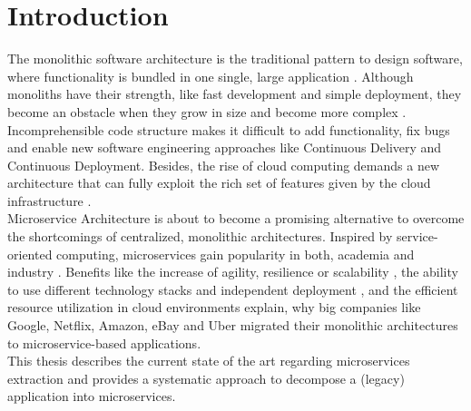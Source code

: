 
\chapter{Introduction}
\label{ch:Introduction}
The monolithic software architecture is the traditional pattern to design software, where functionality is bundled in one single, large application \cite{DataflowDrivenChen}. Although monoliths have their strength, like fast development and simple deployment, they become an obstacle when they grow in size and become more complex \cite{infoq}. Incomprehensible code structure makes it difficult to add functionality, fix bugs and enable new software engineering approaches like Continuous Delivery and Continuous Deployment. 
Besides, the rise of cloud computing demands a new architecture that can fully exploit the rich set of features given by the cloud infrastructure \cite{MigratingCloud}. \\
Microservice Architecture is about to become a promising alternative to overcome the shortcomings of centralized, monolithic architectures. Inspired by service-oriented computing, microservices gain popularity in both, academia and industry \cite{ObjectAwareAmiri}. Benefits like the increase of agility, resilience or scalability \cite{FunctionalDecompositionHeinrich}, the ability to use different technology stacks and independent deployment \cite{interfaceAnalysisBaresi}, and the efficient resource utilization in cloud environments \cite{MigratingCloud} explain, why big companies like Google, Netflix, Amazon, eBay \cite{DataflowDrivenChen} and Uber \cite{FunctionalDecompositionHeinrich} migrated their monolithic architectures to microservice-based applications. \\
This thesis describes the current state of the art regarding microservices extraction and provides a systematic approach to decompose a (legacy) application into microservices.


